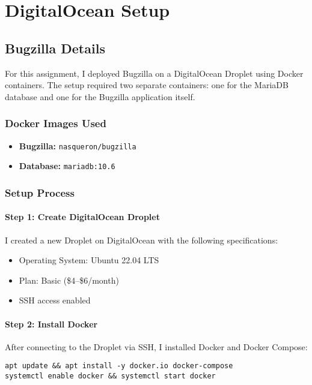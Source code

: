 \chapter{DigitalOcean Setup}
\label{chap:digitalocean}

\section{Bugzilla Details}

For this assignment, I deployed Bugzilla on a DigitalOcean Droplet using Docker containers. The setup required two separate containers: one for the MariaDB database and one for the Bugzilla application itself.

\subsection{Docker Images Used}
\begin{itemize}
    \item \textbf{Bugzilla:} \texttt{nasqueron/bugzilla}
    \item \textbf{Database:} \texttt{mariadb:10.6}
\end{itemize}

\subsection{Setup Process}

\subsubsection{Step 1: Create DigitalOcean Droplet}
I created a new Droplet on DigitalOcean with the following specifications:
\begin{itemize}
    \item Operating System: Ubuntu 22.04 LTS
    \item Plan: Basic (\$4--\$6/month)
    \item SSH access enabled
\end{itemize}

\subsubsection{Step 2: Install Docker}
After connecting to the Droplet via SSH, I installed Docker and Docker Compose:
\begin{verbatim}
apt update && apt install -y docker.io docker-compose
systemctl enable docker && systemctl start docker
\end{verbatim}


